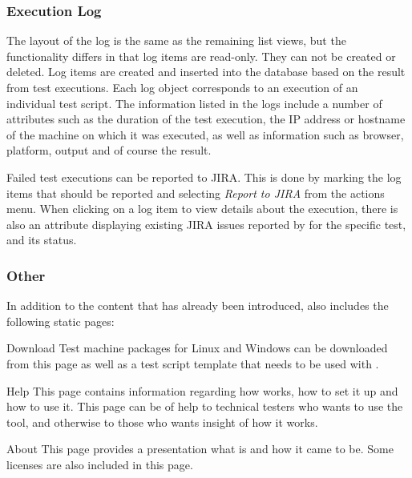 \subsubsection{Execution Log}


The layout of the log is the same as the remaining list views, but the functionality differs in that log items are read-only. They can not be created or deleted. Log items are created and inserted into the database based on the result from test executions. Each log object corresponds to an execution of an individual test script. The information listed in the logs include a number of attributes such as the duration of the test execution, the IP address or hostname of the machine on which it was executed, as well as information such as browser, platform, output and of course the result.

Failed test executions can be reported to JIRA. This is done by marking the log items that should be reported and selecting \emph{Report to JIRA} from the actions menu. When clicking on a log item to view details about the execution, there is also an attribute displaying existing JIRA issues reported by \toolname \space for the specific test, and its status.







\subsubsection{Other}



In addition to the content that has already been introduced, \toolname \space also includes the following static pages:

\begin{Description}
    \item [Download] Test machine packages for Linux and Windows can be downloaded from this page as well as a test script template that needs to be used with \toolname.
    \item [Help] This page contains information regarding how \toolname \space works, how to set it up and how to use it. This page can be of help to technical testers who wants to use the tool, and otherwise to those who wants insight of how it works.
    \item [About] This page provides a presentation what \toolname \space is and how it came to be. Some licenses are also included in this page.
\end{Description}